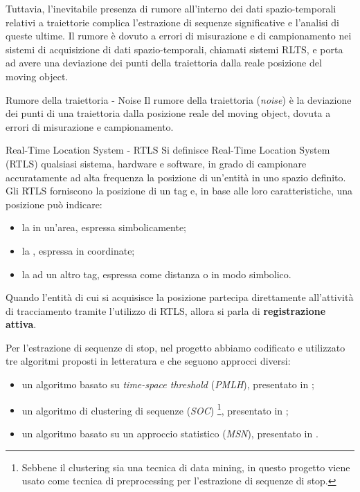 \documentclass[12pt]{article}
\begin{document}
Tuttavia, l'inevitabile presenza di rumore all'interno dei dati spazio-temporali relativi a traiettorie complica l'estrazione di sequenze significative e l'analisi di queste ultime.
Il rumore è dovuto a errori di misurazione e di campionamento nei sistemi di acquisizione di dati spazio-temporali, chiamati sistemi RLTS, e porta ad avere una deviazione dei punti della traiettoria dalla reale posizione del moving object.
\begin{definition}{Rumore della traiettoria - Noise}{}
Il rumore della traiettoria (\emph{noise}) è la deviazione dei punti di una traiettoria dalla posizione reale del moving object, dovuta a errori di misurazione e campionamento.
\end{definition}
\begin{definition}{Real-Time Location System - RTLS}{}
    Si definisce Real-Time Location System (RTLS) qualsiasi sistema, hardware e software, in grado di campionare accuratamente ad alta frequenza la posizione di un'entità in uno spazio definito.\\
    Gli RTLS forniscono la posizione di un tag e, in base alle loro caratteristiche, una posizione può indicare:
    \begin{itemize}
        \item la  in un'area, espressa simbolicamente;
        \item la , espressa in coordinate;
        \item la  ad un altro tag, espressa come distanza o in modo simbolico.
    \end{itemize}
    Quando l'entità di cui si acquisisce la posizione partecipa direttamente all'attività di tracciamento tramite l'utilizzo di RTLS, allora si parla di \textbf{registrazione attiva}.
\end{definition}
Per l'estrazione di sequenze di stop, nel progetto abbiamo codificato e utilizzato tre algoritmi proposti in letteratura e che seguono approcci diversi:
\begin{itemize}
    \item un algoritmo basato su \emph{time-space threshold} (\emph{PMLH}), presentato in \cite{SpaceTimeTreshold};
    \item un algoritmo di clustering di sequenze (\emph{SOC}) \footnote{Sebbene il clustering sia una tecnica di data mining, in questo progetto viene usato come tecnica di preprocessing per l'estrazione di sequenze di stop.}, presentato in \cite{SequenceClustering};
    \item un algoritmo basato su un approccio statistico (\emph{MSN}), presentato in \cite{Statistical}.
\end{itemize}
\end{document}
